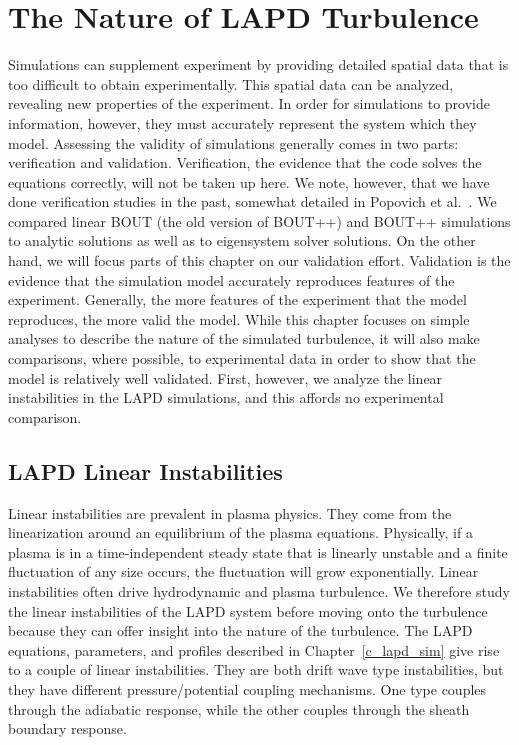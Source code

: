 \chapter{The Nature of LAPD Turbulence}
\label{c_lapd_turb}

Simulations can supplement experiment by providing detailed spatial data that is too difficult to obtain experimentally. This spatial data can be analyzed, revealing new properties
of the experiment. In order for simulations to provide information, however, they must accurately represent the system which they model. Assessing the validity of simulations generally
comes in two parts: verification and validation. Verification, the evidence that the code solves the equations correctly, will not be taken up here. We note, however, that we
have done verification studies in the past, somewhat detailed in Popovich et al.~\cite{Popovich2010a}. We compared linear BOUT (the old version of BOUT++) and BOUT++ simulations
to analytic solutions as well as to eigensystem solver solutions. On the other hand, we will focus parts of this chapter on our validation effort. Validation is the evidence that
the simulation model accurately reproduces features of the experiment. Generally, the more features of the experiment that the model reproduces, the more valid the model. While this chapter
focuses on simple analyses to describe the nature of the simulated turbulence, it will also make comparisons, where possible, to experimental data in order to show that the model is
relatively well validated. First, however, we analyze the linear instabilities in the LAPD simulations, and this affords no experimental comparison.

\section{LAPD Linear Instabilities}
\label{s_lin_inst}

Linear instabilities are prevalent in plasma physics. They come from the linearization around an equilibrium of the plasma equations. Physically, if a plasma is in a time-independent
steady state that is linearly unstable and a finite fluctuation of any size occurs, the fluctuation will grow exponentially. Linear instabilities often drive hydrodynamic and plasma
turbulence. We therefore study the linear instabilities of the LAPD system before moving onto the turbulence because they can offer insight into the nature of the turbulence.
The LAPD equations, parameters, and profiles described in Chapter~\ref{c_lapd_sim} give rise to a couple of linear instabilities. They are both drift wave type instabilities, but they 
have different pressure/potential coupling mechanisms. One type couples through the adiabatic response, while the other couples through the sheath boundary response.

